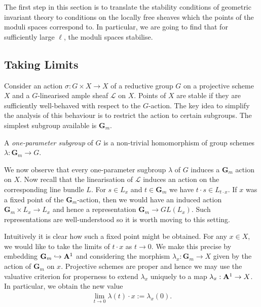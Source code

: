 \documentclass[12pt]{ociamthesis}  %
\begin{document}
The first step in this section is to translate the stability
conditions of geometric invariant theory to conditions on the locally
free sheaves which the points of the moduli spaces correspond to.
In particular, we are going to find that for sufficiently large $\ell$,
the moduli spaces stabilise.

\subsection{Taking Limits}

Consider an action $\sigma : G \times X\to X$ of a reductive group $G$
on a projective scheme $X$ and a $G$-linearised ample sheaf
$\mathscr L$ on $X$. Points of $X$ are stable if they are sufficiently
well-behaved with respect to the $G$-action. The key idea to simplify
the analysis of this behaviour is to restrict the action to certain
subgroups. The simplest subgroup available is $\mathbf G_m$.

\begin{definition}
  A \emph{one-parameter subgroup} of $G$ is a non-trivial homomorphism
  of group schemes $\lambda : \mathbf G_m \to G$.
\end{definition}

We now observe that every one-parameter sugbroup $\lambda$ of $G$
induces a $\mathbf G_m$ action on $X$. Now recall that the
linearisation of $\mathscr L$ induces an action on the corresponding
line bundle $L$. For $s\in L_x$ and $t\in \mathbf G_m$ we have
$t\cdot s\in L_{t\cdot x}$. If $x$ was a fixed point of the
$\mathbf G_m$-action, then we would have an induced action
$\mathbf G_m\times L_x \to L_x$ and hence a representation
$\mathbf G_m\to GL(L_x)$. Such representations are well-understood
so it is worth moving to this setting.

Intuitively it is clear how such a fixed point might be obtained.
For any $x\in X$, we would like to take the limits of $t\cdot x$
as $t\to 0$. We make this precise
by embedding $\mathbf G_m\hookrightarrow\mathbf A^1$ and
considering the morphism $\lambda_x : \mathbf G_m \to X$ given by
the action of $\mathbf G_m$ on $x$.
Projective schemes are proper and hence we may use the valuative
criterion for properness to extend $\lambda_x$ uniquely to a map
$\lambda_x : \mathbf{A}^{1}_{} \to X$.
In particular, we obtain the new value
\begin{align*}
  \lim_{t\to 0}\lambda(t)\cdot x := \lambda_x(0).
\end{align*}
\end{document}
